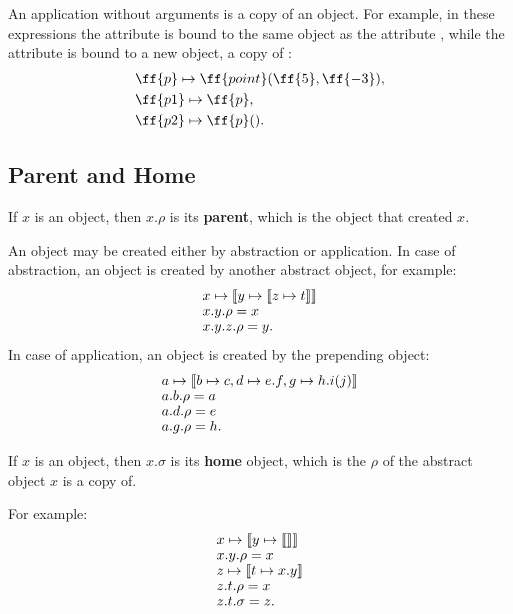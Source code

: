 An application without arguments is a copy of an object. For example,
in these expressions the attribute  is bound to the same object
as the attribute , while the attribute  is bound to a new
object, a copy of :
\begin{equation*}
\begin{split}
& \ff{p} \mapsto \ff{point}(\ff{5}, \ff{-3}),\\
& \ff{p1} \mapsto \ff{p},\\
& \ff{p2} \mapsto \ff{p}().\\
\end{split}
\end{equation*}

\subsection{Parent and Home}

\begin{eodefinition}\label{def:parent}
If $x$ is an object, then $x.\rho$ is its \textbf{parent},
which is the object that created $x$.
\end{eodefinition}

An object may be created either by
abstraction or application. In case of abstraction, an object
is created by another abstract object, for example:
  \begin{equation}
  \begin{split}
  & x \mapsto \llbracket y \mapsto \llbracket z \mapsto t \rrbracket \rrbracket \br
  & x.y.\rho = x \br
  & x.y.z.\rho = y.
  \end{split}
  \end{equation}
In case of application, an object is created by the prepending object:
  \begin{equation}
  \begin{split}
  & a \mapsto \llbracket b \mapsto c, d \mapsto e.f, g \mapsto h.i(j) \rrbracket \br
  & a.b.\rho = a \br
  & a.d.\rho = e \br
  & a.g.\rho = h.
  \end{split}
  \end{equation}

\begin{eodefinition}\label{def:home}
If $x$ is an object, then $x.\sigma$ is its \textbf{home} object, which
is the $\rho$ of the abstract object $x$ is a copy of.
\end{eodefinition}

For example:
\begin{equation}
\begin{split}
& x \mapsto \llbracket y \mapsto \llbracket \rrbracket \rrbracket \br
& x.y.\rho = x \br
& z \mapsto \llbracket t \mapsto x.y \rrbracket \br
& z.t.\rho = x \br
& z.t.\sigma = z.
\end{split}
\end{equation}

